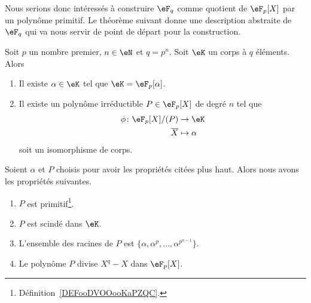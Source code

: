 Nous serions donc intéressés à construire \( \eF_{q}\) comme quotient de \( \eF_p[X]\) par un polynôme primitif. Le théorème suivant donne une description abstraite de \( \eF_q\) qui va nous servir de point de départ pour la construction.
\begin{theorem}   \label{ThoqSludu}
	Soit \( p\) un nombre premier, \( n\in \eN\) et \( q=p^n\). Soit \( \eK\) un corps à \( q\) éléments. Alors
	\begin{enumerate}
		\item
		      Il existe \( \alpha\in \eK\) tel que \( \eK=\eF_p[\alpha]\).
		\item
		      Il existe un polynôme irréductible \( P\in\eF_p[X]\) de degré \( n\) tel que
		      \begin{equation}        \label{EqWlMhhm}
			      \begin{aligned}
				      \phi\colon \eF_p[X]/(P) & \to \eK         \\
				      \overline        X      & \mapsto \alpha
			      \end{aligned}
		      \end{equation}
		      soit un isomorphisme de corps.
	\end{enumerate}
	Soient \( \alpha\) et \( P\) choisis pour avoir les propriétés citées plus haut. Alors nous avons les propriétés suivantes.
	\begin{enumerate}
		\item
		      \( P\) est primitif\footnote{Définition~\ref{DEFooDVOOooKaPZQC}.}.
		\item
		      \( P\) est scindé dans \( \eK\).
		\item
		      L'ensemble des racines de \( P\) est \( \{ \alpha,\alpha^p,\ldots, \alpha^{p^{n-1}} \}\).
		\item
		      Le polynôme \( P\) divise \( X^q-X\) dans \( \eF_p[X]\).
	\end{enumerate}
\end{theorem}

